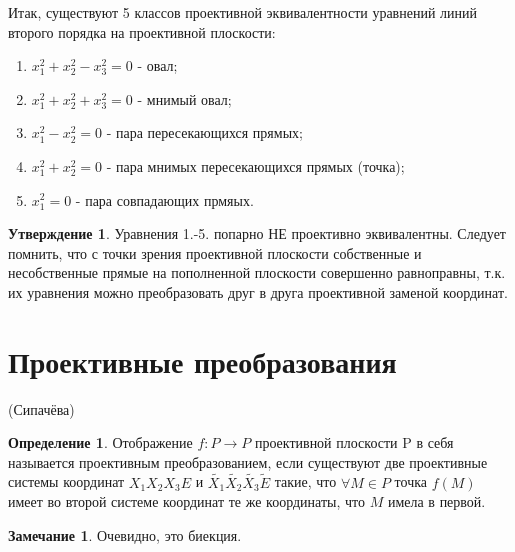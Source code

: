 \documentclass[a4paper, 12pt]{article}
\theoremstyle{definition}
\newtheorem*{definition}{Определение}
\newtheorem*{subtheorem}{Утверждение}
\newtheorem*{remark}{Замечание}
\begin{document}
Итак, существуют 5 классов проективной эквивалентности уравнений линий второго порядка на проективной плоскости:
\begin{enumerate}
    \item $x_1^2 + x_2^2 - x_3^2 = 0$ - овал;
    \item $x_1^2 + x_2^2 + x_3^2 = 0$ - мнимый овал;
    \item $x_1^2 - x_2^2 = 0$ - пара пересекающихся прямых;
    \item $x_1^2 + x_2^2 = 0$ - пара мнимых пересекающихся прямых (точка);
    \item $x_1^2 = 0$ - пара совпадающих прмяых.
\end{enumerate}

\begin{subtheorem}
    Уравнения 1.-5. попарно НЕ проективно эквивалентны. Следует помнить, что с точки зрения проективной плоскости собственные и несобственные прямые на пополненной плоскости совершенно равноправны, т.к. их уравнения можно преобразовать друг в друга проективной заменой координат.
\end{subtheorem}


\section{Проективные преобразования}
(Сипачёва)
\begin{definition}
    Отображение $f: P \to P$ проективной плоскости P в себя называется проективным преобразованием, если существуют две проективные системы координат $X_1X_2X_3E$ и $\tilde{X_1}\tilde{X_2}\tilde{X_3}\tilde{E}$ такие, что $\forall M \in P$ точка $f(M)$ имеет во второй системе координат те же координаты, что $M$ имела в первой.
\end{definition}
\begin{remark}
    Очевидно, это биекция.
\end{remark}
\end{document}
